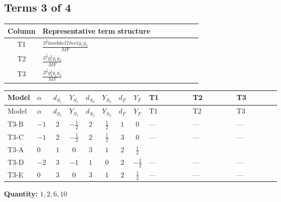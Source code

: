 \documentclass[8pt]{article}
\begin{document}
\begin{landscape}
\subsection*{Terms 3 of 4}
\begin{center}
\begin{tabular}{@{}c >{\raggedright\arraybackslash}p{0.82\linewidth}@{}}
\toprule
Column & Representative term structure \\
\midrule
T1 & \(\displaystyle \frac{3^{\frac{3}{4}} lambda12Inv1 \overline{y_{1}} \overline{y_{2}}}{MF}\) \\
\midrule
T2 & \(\displaystyle \frac{3^{\frac{3}{4}} g_{1}^{2} \overline{y_{1}} \overline{y_{2}}}{MF}\) \\
\midrule
T3 & \(\displaystyle \frac{3^{\frac{3}{4}} g_{2}^{2} \overline{y_{1}} \overline{y_{2}}}{MF}\) \\
\midrule
\bottomrule
\end{tabular}
\end{center}
\smallskip
\tiny
\begin{longtable}{@{}llcccccc >{\raggedright\arraybackslash}p{0.21\linewidth} >{\raggedright\arraybackslash}p{0.21\linewidth} >{\raggedright\arraybackslash}p{0.21\linewidth}@{}}
\toprule
Model & $\alpha$ & $d_{S_1}$ & $Y_{S_1}$ & $d_{S_2}$ & $Y_{S_2}$ & $d_F$ & $Y_F$ & T1 & T2 & T3 \\
\midrule
\endfirsthead
\toprule
Model & $\alpha$ & $d_{S_1}$ & $Y_{S_1}$ & $d_{S_2}$ & $Y_{S_2}$ & $d_F$ & $Y_F$ & T1 & T2 & T3 \\
\midrule
\endhead
T3-B & $-1$ & $2$ & $-\frac{1}{2}$ & $2$ & $\frac{1}{2}$ & $1$ & $0$ & --- & --- & --- \\
\midrule
T3-C & $-1$ & $2$ & $-\frac{1}{2}$ & $2$ & $\frac{1}{2}$ & $3$ & $0$ & --- & --- & --- \\
\midrule
T3-A & $0$ & $1$ & $0$ & $3$ & $1$ & $2$ & $\frac{1}{2}$ & \scriptsize\adjustbox{max width=\linewidth}{$\begin{gathered} \frac{3^{\frac{3}{4}} lambda12Inv1 \overline{y_{1}} \overline{y_{2}}}{6 MF}\end{gathered}$} & \scriptsize\adjustbox{max width=\linewidth}{$\begin{gathered} \frac{3^{\frac{3}{4}} g_{1}^{2} \overline{y_{1}} \overline{y_{2}}}{8 MF}\end{gathered}$} & \scriptsize\adjustbox{max width=\linewidth}{$\begin{gathered} \frac{25 \cdot 3^{\frac{3}{4}} g_{2}^{2} \overline{y_{1}} \overline{y_{2}}}{24 MF}\end{gathered}$} \\
\midrule
T3-D & $-2$ & $3$ & $-1$ & $1$ & $0$ & $2$ & $-\frac{1}{2}$ & --- & --- & --- \\
\midrule
T3-E & $0$ & $3$ & $0$ & $3$ & $1$ & $2$ & $\frac{1}{2}$ & --- & --- & --- \\
\midrule
\bottomrule
\end{longtable}
\clearpage
\noindent\textbf{Quantity: }$\mathrm{1,2,6,10}$\par\smallskip

\end{landscape}
\end{document}
